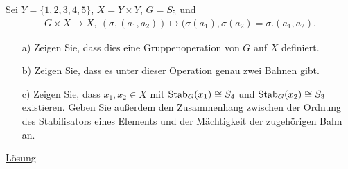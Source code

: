 \begin{exe}\label{aufgabe:2.9}
	Sei $ Y = \lbrace 1,2,3,4,5\rbrace $, $ X = Y \times Y $,
	$ G = S_5 $ und
	\begin{align*}
	G \times X \to X, \ (\sigma,(a_1,a_2)) \mapsto (\sigma(a_1), \sigma(a_2) = \sigma.(a_1,a_2).
	\end{align*}
	\begin{enumerate}
		\item[a)]
		Zeigen Sie, 
		dass dies eine Gruppenoperation von $ G $ auf $ X $ definiert.
		
		\item[b)]
		Zeigen Sie,
		dass es unter dieser Operation genau zwei Bahnen gibt.
		
		\item[c)]
	    Zeigen Sie,
	    dass $ x_1,x_2 \in X $ mit 
	    $ \operatorname{Stab}_G(x_1) \cong S_4 $ und $ \operatorname{Stab}_G(x_2) \cong S_3 $
	    existieren.
	    Geben Sie außerdem den Zusammenhang zwischen der Ordnung des Stabilisators eines Elements und der Mächtigkeit der zugehörigen Bahn an. 
	\end{enumerate}
	\hyperlink{loes:2.9}{Lösung}
\end{exe}